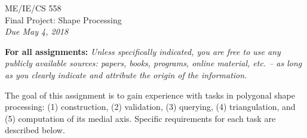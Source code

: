 \documentclass[11pt]{article}
\begin{document}
\begin{center}
{\Large ME/IE/CS 558}\\
\vspace{12pt}
{\large Final Project: Shape Processing}\\
\vspace{12pt}
{\em Due May 4, 2018}
\end{center}

{\bf For all assignments:}
{\em Unless specifically indicated,  you are free to use any
publicly available sources: papers, books, programs, online
material, etc. -- as long as you clearly indicate and attribute
the origin of the information.}

\vspace{12pt}
The goal of this assignment is to gain experience with tasks in polygonal shape processing:  (1) construction, (2) validation,  (3) querying, (4) triangulation, and (5) computation of its medial axis.   Specific requirements for each task are described below. 
\end{document}
